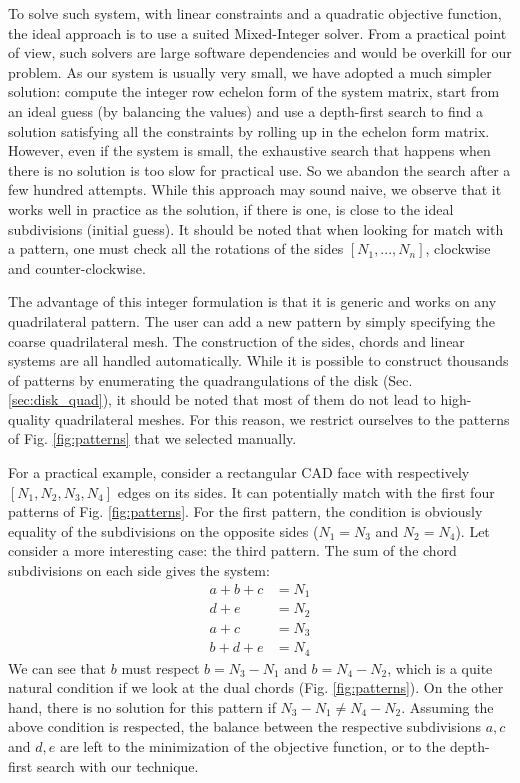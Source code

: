 \documentclass[AMA,STIX1COL]{WileyNJD-v2}
\newcommand\rsec[1]{Sec. \ref{#1}}
\newcommand\rfig[1]{Fig. \ref{#1}}
\begin{document}
{To solve such system, with linear constraints and a quadratic objective function,
the ideal approach is to use a suited Mixed-Integer solver. From a practical
point of view, such solvers are large software dependencies and would be overkill
for our problem. As our system is usually very small, we have adopted a much
simpler solution: compute the integer row echelon form of the system matrix, 
start from an ideal guess (by balancing the values) and use a depth-first search
to find a solution satisfying all the constraints by rolling up in the echelon form matrix.
However, even if the system is small, the
exhaustive search that happens when there is no solution is too slow for practical use.
So we abandon the search after a few hundred attempts. While this approach may sound
 naive, we observe that it works well in practice as the solution, if there is one, is close
to the ideal subdivisions (initial guess).  It should be noted that when looking for match with
a pattern, one must check all the rotations of the sides $[N_1, ..., N_n]$,
clockwise and counter-clockwise.

The advantage of this integer formulation is that it is generic and works on any quadrilateral pattern.
The user can add a new pattern by simply specifying the coarse quadrilateral mesh. The
construction of the sides, chords and linear systems are all handled automatically.
While it is possible to construct thousands of patterns by enumerating the quadrangulations
of the disk (\rsec{sec:disk_quad}), it should be noted that most of them do not lead to high-quality
quadrilateral meshes. For this reason, we restrict ourselves to the patterns
of \rfig{fig:patterns} that we selected manually.

For a practical example, consider a rectangular CAD face with respectively
$[N_1,N_2,N_3,N_4]$ edges on its sides. It can potentially match with the first
four patterns of \rfig{fig:patterns}. For the first pattern, the condition
is obviously equality of the subdivisions on the opposite sides ($N_1=N_3$ and $N_2=N_4$).
Let consider a more interesting case: the third pattern. The sum of
the chord subdivisions on each side gives the system:
\begin{align}
    a+b+c &= N_1 \nonumber \\
    d+e &= N_2 \nonumber \\
    a+c &= N_3\nonumber \\
    b+d+e &= N_4 \nonumber
\end{align}
We can see that $b$ must respect $b = N_3 - N_1$ and $b = N_4-N_2$, which
is a quite natural condition if we look at the dual chords (\rfig{fig:patterns}). 
On the other hand, there is no solution for this pattern if $N_3 - N_1 \neq N_4 - N_2$.
Assuming the above condition is respected, the balance between the respective subdivisions
$a,c$ and $d,e$ are left to the minimization of the objective function, or to the
depth-first search with our technique. 

}
\end{document}
